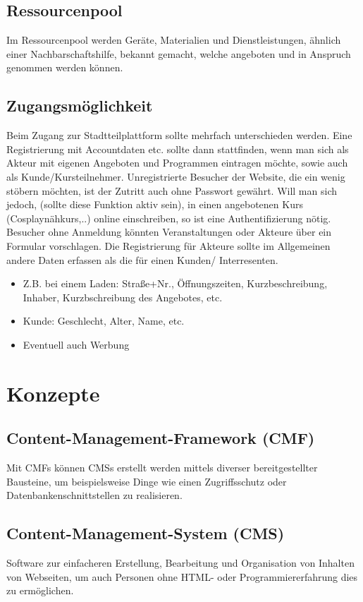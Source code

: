 \documentclass{swp}
\begin{document}
\subsection{Ressourcenpool}
Im Ressourcenpool werden Ger\"ate, Materialien und Dienstleistungen, \"ahnlich einer Nachbarschaftshilfe, bekannt gemacht, welche angeboten und in Anspruch genommen werden k\"onnen. 
\subsection{Zugangsm\"oglichkeit}
Beim Zugang zur Stadtteilplattform sollte mehrfach unterschieden werden. Eine Registrierung mit Accountdaten etc. sollte dann stattfinden, wenn man sich als Akteur mit eigenen Angeboten und Programmen eintragen m\"ochte, sowie auch als Kunde/Kursteilnehmer. Unregistrierte Besucher der Website, die ein wenig st\"obern m\"ochten, ist der Zutritt auch ohne Passwort gew\"ahrt. Will man sich jedoch, (sollte diese Funktion aktiv sein), in einen angebotenen Kurs (Cosplayn\"ahkurs,..) online einschreiben, so ist eine Authentifizierung n\"otig. Besucher ohne Anmeldung k\"onnten Veranstaltungen oder Akteure \"uber ein Formular vorschlagen. Die Registrierung f\"ur Akteure sollte im Allgemeinen andere Daten erfassen als die f\"ur einen Kunden/ Interresenten.
\begin{itemize}
\item Z.B. bei einem Laden: Stra{\ss}e+Nr., \"Offnungszeiten, Kurzbeschreibung, Inhaber, Kurzbschreibung des Angebotes, etc.
\item Kunde: Geschlecht, Alter, Name, etc.
\item Eventuell auch Werbung
\end{itemize}

\section{Konzepte}
\subsection{Content-Management-Framework (CMF)}
Mit CMFs k\"onnen CMSs erstellt werden mittels diverser bereitgestellter Bausteine, um beispielsweise Dinge wie einen Zugriffsschutz oder Datenbankenschnittstellen zu realisieren.
\subsection{Content-Management-System (CMS)}
Software zur einfacheren Erstellung, Bearbeitung und Organisation von Inhalten von Webseiten, um auch Personen ohne HTML- oder Programmiererfahrung dies zu erm\"oglichen.
\end{document}
